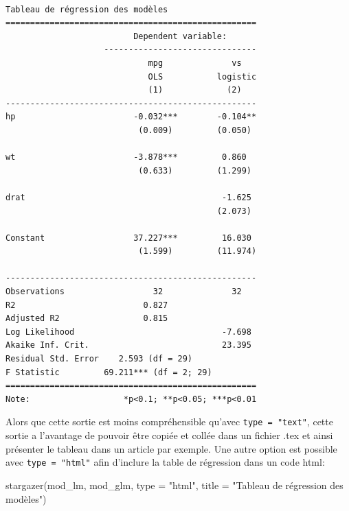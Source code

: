 \documentclass[
  letterpaper,
  DIV=11,
  numbers=noendperiod]{scrreprt}
\newenvironment{Shaded}{\begin{snugshade}}{\end{snugshade}}
\newcommand{\AttributeTok}[1]{\textcolor[rgb]{0.40,0.45,0.13}{#1}}
\newcommand{\FunctionTok}[1]{\textcolor[rgb]{0.28,0.35,0.67}{#1}}
\newcommand{\NormalTok}[1]{\textcolor[rgb]{0.00,0.23,0.31}{#1}}
\newcommand{\StringTok}[1]{\textcolor[rgb]{0.13,0.47,0.30}{#1}}
\begin{document}
\begin{verbatim}

Tableau de régression des modèles
===================================================
                          Dependent variable:      
                    -------------------------------
                             mpg              vs   
                             OLS           logistic
                             (1)             (2)   
---------------------------------------------------
hp                        -0.032***        -0.104**
                           (0.009)         (0.050) 
                                                   
wt                        -3.878***         0.860  
                           (0.633)         (1.299) 
                                                   
drat                                        -1.625 
                                           (2.073) 
                                                   
Constant                  37.227***         16.030 
                           (1.599)         (11.974)
                                                   
---------------------------------------------------
Observations                  32              32   
R2                          0.827                  
Adjusted R2                 0.815                  
Log Likelihood                              -7.698 
Akaike Inf. Crit.                           23.395 
Residual Std. Error    2.593 (df = 29)             
F Statistic         69.211*** (df = 2; 29)         
===================================================
Note:                   *p<0.1; **p<0.05; ***p<0.01
\end{verbatim}

Alors que cette sortie est moins compréhensible qu'avec
\texttt{type\ =\ "text"}, cette sortie a l'avantage de pouvoir être
copiée et collée dans un fichier .tex et ainsi présenter le tableau dans
un article par exemple. Une autre option est possible avec
\texttt{type\ =\ "html"} afin d'inclure la table de régression dans un
code html:

\begin{Shaded}
\begin{Highlighting}[]
\FunctionTok{stargazer}\NormalTok{(mod\_lm, mod\_glm, }\AttributeTok{type =} \StringTok{"html"}\NormalTok{, }\AttributeTok{title =} \StringTok{"Tableau de régression des modèles"}\NormalTok{)}
\end{Highlighting}
\end{Shaded}
\end{document}
